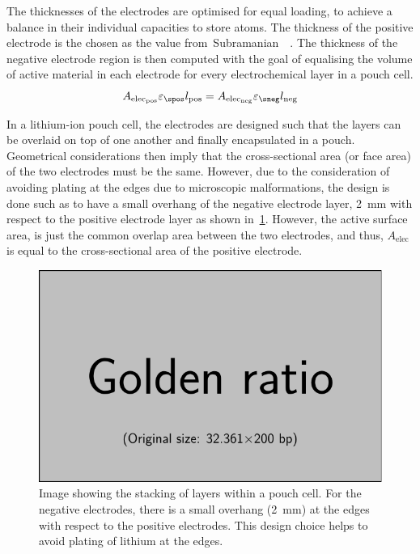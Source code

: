 The  thicknesses  of the  electrodes  are  optimised  for equal  loading,  \ie{}
to  achieve  a   balance  in  their  individual  capacities   to  store  
atoms.  The thickness  of the  positive  electrode is  the chosen  as the  value
from~Subramanian~\etal{}~\cite{Subramanian2009}. The  thickness of  the negative
electrode region  is then  computed with  the goal of  equalising the  volume of
active material  in each electrode  for every  electrochemical layer in  a pouch
cell.
\begin{equation}\label{eq:basiccapacitybalance}
    A_{\text{elec}_\text{pos}}\varepsilon_\spos l_\text{pos} = A_{\text{elec}_\text{neg}}\varepsilon_\sneg l_\text{neg}
\end{equation}

In a  lithium-ion pouch cell, the  electrodes are designed such  that the layers
can be  overlaid on  top of  one another  and finally  encapsulated in  a pouch.
Geometrical considerations  then imply  that the  cross-sectional area  (or face
area) of the two electrodes must be  the same. However, due to the consideration
of  avoiding  plating  at  the  edges  due  to  microscopic  malformations,  the
design  is done  such as  to have  a small  overhang of  the negative  electrode
layer,  \approx\SI{2}{\milli  \meter} with  respect  to  the positive  electrode
layer  as  shown  in~\cref{fig:anodeoverhangpouchcell}.
However, the  active surface area, is  just the common overlap  area between the
two electrodes, and  thus, $A_\text{elec}$ is equal to  the cross-sectional area
of the positive electrode.

\begin{figure}[h]
    \centering
    \includegraphics[width=\textwidth]{placeholder_images/example-image-golden.pdf}
    \caption[Stacking of layers within a pouch cell]
    {Image showing the stacking of layers within a pouch cell. For the negative
        electrodes, there is a small overhang (\approx\SI{2}{mm}) at the
    edges with respect to the positive electrodes. This design choice
helps to avoid plating of lithium at the edges.}
    \label{fig:anodeoverhangpouchcell}
\end{figure}


